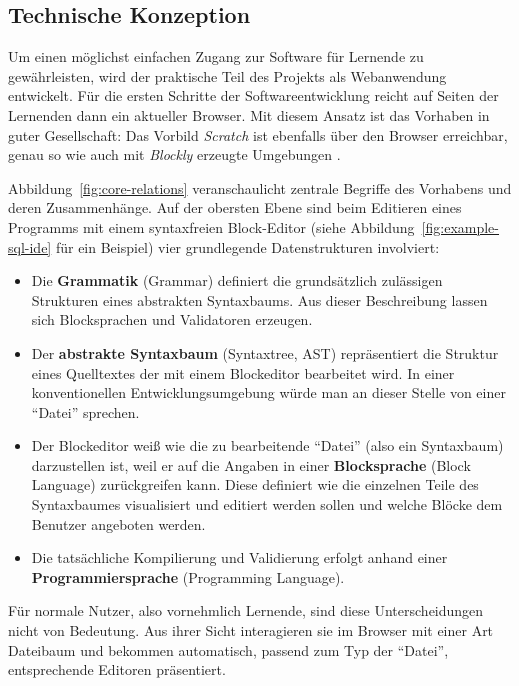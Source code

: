 \documentclass[paper=a4,fontsize=11pt,parskip=half]{scrartcl}
\begin{document}
\subsection{Technische Konzeption}

Um einen möglichst einfachen Zugang zur Software für Lernende zu gewährleisten, wird der praktische Teil des Projekts als Webanwendung entwickelt. Für die ersten Schritte der Softwareentwicklung reicht auf Seiten der Lernenden dann ein aktueller Browser. Mit diesem Ansatz ist das Vorhaben in guter Gesellschaft: Das Vorbild \textit{Scratch} ist ebenfalls über den Browser erreichbar, genau so wie auch mit \textit{Blockly} erzeugte Umgebungen \cite[vgl. S. 28]{riemer_blattwerkzeug_2016}.

Abbildung~\ref{fig:core-relations} veranschaulicht zentrale Begriffe des Vorhabens und deren Zusammenhänge. Auf der obersten Ebene sind beim Editieren eines Programms mit einem syntaxfreien Block-Editor (siehe Abbildung~\ref{fig:example-sql-ide} für ein Beispiel) vier grundlegende Datenstrukturen involviert:

\begin{itemize}
\item Die \textbf{Grammatik} (Grammar) definiert die grundsätzlich zulässigen Strukturen eines abstrakten Syntaxbaums. Aus dieser Beschreibung lassen sich Blocksprachen und Validatoren erzeugen.
\item Der \textbf{abstrakte Syntaxbaum} (Syntaxtree, AST) repräsentiert die Struktur eines Quelltextes der mit einem Blockeditor bearbeitet wird. In einer konventionellen Entwicklungsumgebung würde man an dieser Stelle von einer \enquote{Datei} sprechen.
\item Der Blockeditor weiß wie die zu bearbeitende \enquote{Datei} (also ein Syntaxbaum) darzustellen ist, weil er auf die Angaben in einer \textbf{Blocksprache} (Block Language) zurückgreifen kann. Diese definiert wie die einzelnen Teile des Syntaxbaumes visualisiert und editiert werden sollen und welche Blöcke dem Benutzer angeboten werden.
\item Die tatsächliche Kompilierung und Validierung erfolgt anhand einer \textbf{Programmiersprache} (Programming Language).
\end{itemize}

Für normale Nutzer, also vornehmlich Lernende, sind diese Unterscheidungen nicht von Bedeutung. Aus ihrer Sicht interagieren sie im Browser mit einer Art Dateibaum und bekommen automatisch, passend zum Typ der \enquote{Datei}, entsprechende Editoren präsentiert.
\end{document}
